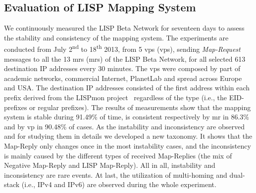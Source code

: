 \subsection{Evaluation of LISP Mapping System}
We continuously measured the LISP Beta Network for seventeen days to assess the stability and consistency of the mapping system. The experiments are conducted from July 2\textsuperscript{nd} to 18\textsuperscript{th} 2013, from 5 \acrlong{vp}s (\acrshort{vp}s), sending \emph{Map-Request} messages to all the 13 \acrlong{mr}s (\acrshort{mr}s) of the LISP Beta Network, for all selected 613 destination IP addresses every 30 minutes. The \acrshort{vp}s were composed by part of academic networks, commercial Internet, PlanetLab and spread across Europe and USA. The destination IP addresses consisted of the first address within each prefix derived from the LISPmon project~\cite{lispmon} regardless of the type (i.e., the EID-prefixes or regular prefixes). The results of measurements show that the mapping system is stable during 91.49\% of time, is consistent respectively by \acrshort{mr} in 86.3\% and by \acrshort{vp} in 90.48\% of cases. As the instability and inconsistency are observed and for studying them in details we developed a new taxonomy. It shows that the Map-Reply only changes once in the most instability cases, and the inconsistency is mainly caused by the different types of received Map-Replies (the mix of Negative Map-Reply and LISP Map-Reply). All in all, instability and inconsistency are rare events. At last, the utilization of multi-homing and dual-stack (i.e., IPv4 and IPv6) are observed during the whole experiment.


